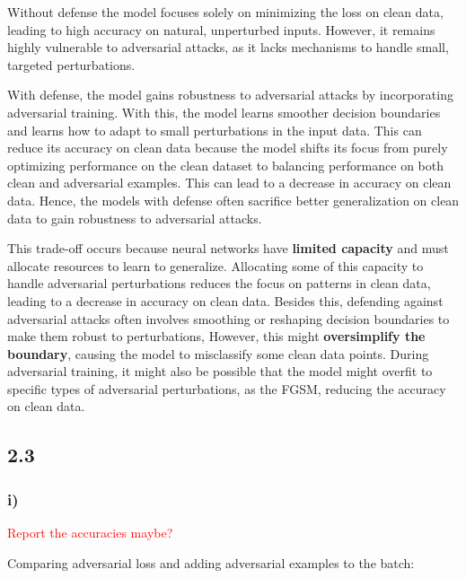 \documentclass{article}
\begin{document}
Without defense the model focuses solely on minimizing the loss on clean data, leading to high accuracy on natural,
unperturbed inputs. However, it remains highly vulnerable to adversarial attacks, as it lacks mechanisms to handle small,
targeted perturbations. 

With defense, the model gains robustness to adversarial attacks by incorporating adversarial training. With this,
the model learns smoother decision boundaries and learns how to adapt to small perturbations in the input data. This
can reduce its accuracy on clean data because the model shifts its focus from purely optimizing performance on the clean dataset
to balancing performance on both clean and adversarial examples. This can lead to a decrease in accuracy on clean data.
Hence, the models with defense often sacrifice better generalization on clean data to gain robustness to adversarial attacks.

This trade-off occurs because neural networks have \textbf{limited capacity} and must allocate resources to learn to generalize.
Allocating some of this capacity to handle adversarial perturbations reduces the focus on patterns in clean data, leading to
a decrease in accuracy on clean data.
Besides this, defending against adversarial attacks often involves smoothing or reshaping decision boundaries to make them robust
to perturbations, However, this might \textbf{oversimplify the boundary}, causing the model to misclassify some clean data points.
During adversarial training, it might also be possible that the model might overfit to specific types of adversarial perturbations,
as the FGSM, reducing the accuracy on clean data.


\subsection*{2.3}

\subsubsection*{i)}

\textcolor{red}{Report the accuracies maybe?}

Comparing adversarial loss and adding adversarial examples to the batch: 
\end{document}

